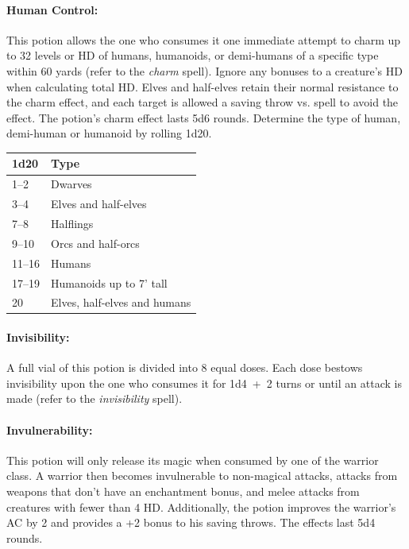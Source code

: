 \begin{multicols}{2}
\paragraph{Human Control:} This potion allows the one who consumes it one immediate attempt to charm up to 32 levels or HD of humans, humanoids, or demi-humans of a specific type within 60 yards (refer to the \textit{charm} spell).  Ignore any bonuses to a creature's HD when calculating total HD.  Elves and half-elves retain their normal resistance to the charm effect, and each target is allowed a saving throw vs. spell to avoid the effect.  The potion's charm effect lasts 5d6 rounds.  Determine the type of human, demi-human or humanoid by rolling 1d20. 
 
\noindent
\begin{tabular}{|p{}|p{}|}
\hline
1d20	& Type \\
\hline\hline
\rowcolor[gray]{.9}1--2	& Dwarves \\
3--4	& Elves and half-elves \\
\rowcolor[gray]{.9}7--8	& Halflings \\
9--10	& Orcs and half-orcs \\
\rowcolor[gray]{.9}11--16	& Humans \\
17--19	& Humanoids up to 7' tall \\
\rowcolor[gray]{.9}20	& Elves, half-elves and humans \\
\hline
\end{tabular}

\paragraph{Invisibility:} A full vial of this potion is divided into 8 equal doses.  Each dose bestows invisibility upon the one who consumes it for 1d4~+~2 turns or until an attack is made (refer to the \textit{invisibility} spell).

\paragraph{Invulnerability:} This potion will only release its magic when consumed by one of the warrior class.  A warrior then becomes invulnerable to non-magical attacks, attacks from weapons that don't have an enchantment bonus, and melee attacks from creatures with fewer than 4 HD.  Additionally, the potion improves the warrior's AC by 2 and provides a +2 bonus to his saving throws.  The effects last 5d4 rounds.


\end{multicols}
